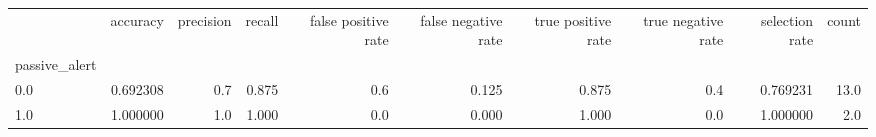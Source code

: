 \begin{tabular}{lrrrrrrrrr}
\toprule
{} &  accuracy &  precision &  recall &  false positive rate &  false negative rate &  true positive rate &  true negative rate &  selection rate &  count \\
passive\_alert &           &            &         &                      &                      &                     &                     &                 &        \\
\midrule
0.0           &  0.692308 &        0.7 &   0.875 &                  0.6 &                0.125 &               0.875 &                 0.4 &        0.769231 &   13.0 \\
1.0           &  1.000000 &        1.0 &   1.000 &                  0.0 &                0.000 &               1.000 &                 0.0 &        1.000000 &    2.0 \\
\bottomrule
\end{tabular}
